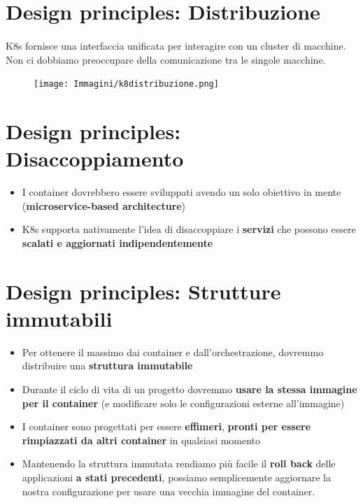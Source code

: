 \documentclass[a4paper, 12pt]{report}
\begin{document}
          \section{Design principles: Distribuzione}
          \paragraph{}K8s fornisce una interfaccia unificata per interagire con un cluster di macchine. Non ci dobbiamo preoccupare della comunicazione tra le singole macchine.
          \begin{figure}[htbp]
            \centering
            \texttt{[image: Immagini/k8distribuzione.png]}
          \end{figure}
          \clearpage
          \section{Design principles: Disaccoppiamento}
          \begin{itemize}
            \item I container dovrebbero essere sviluppati avendo un solo obiettivo in mente (\textbf{microservice-based architecture})
            \item K8s supporta nativamente l'idea di disaccoppiare i \textbf{servizi} che possono essere \textbf{scalati e aggiornati indipendentemente}
          \end{itemize} 
          \section{Design principles: Strutture immutabili}
          \begin{itemize}
            \item Per ottenere il massimo dai container e dall'orchestrazione, dovremmo distribuire una \textbf{struttura immutabile}
            \item Durante il ciclo di vita di un progetto dovremmo \textbf{usare la stessa immagine per il container} (e modificare solo le configurazioni esterne all'immagine)
            \item I container sono progettati per essere \textbf{effimeri}, \textbf{pronti per essere rimpiazzati da altri container} in qualsiasi momento
            \item Mantenendo la struttura immutata rendiamo più facile il \textbf{roll back} delle applicazioni \textbf{a stati precedenti}, possiamo semplicemente aggiornare la nostra configurazione per usare una vecchia immagine del container.
          \end{itemize}
          \clearpage
\end{document}
